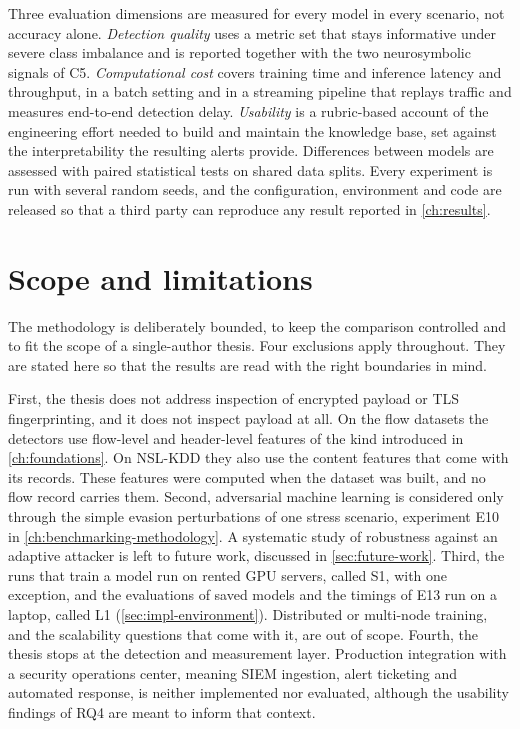 Three evaluation dimensions are measured for every model in every scenario,
not accuracy alone. \emph{Detection quality} uses a metric set that stays
informative under severe class imbalance and is reported together with the
two neurosymbolic signals of C5. \emph{Computational cost} covers training
time and inference latency and throughput, in a batch setting and in a
streaming pipeline that replays traffic and measures end-to-end detection
delay. \emph{Usability} is a rubric-based account of the engineering effort
needed to build and maintain the knowledge base, set against the
interpretability the resulting alerts provide. Differences between models
are assessed with paired statistical tests on shared data splits. Every
experiment is run with several random seeds, and the configuration,
environment and code are released so that a third party can reproduce any
result reported in \cref{ch:results}.

\section{Scope and limitations}
\label{sec:scope-limitations}

The methodology is deliberately bounded, to keep the comparison controlled
and to fit the scope of a single-author thesis. Four exclusions apply
throughout. They are stated here so that the results are read with the right
boundaries in mind.

First, the thesis does not address inspection of encrypted payload or TLS
fingerprinting, and it does not inspect payload at all. On the flow datasets
the detectors use flow-level and header-level features of the kind
introduced in \cref{ch:foundations}. On NSL-KDD they also use the content
features that come with its records. These features were computed when the
dataset was built, and no flow record carries them. Second, adversarial
machine learning is considered only through the simple evasion perturbations
of one stress scenario, experiment E10 in \cref{ch:benchmarking-methodology}. A
systematic study of robustness against an adaptive attacker is left to
future work, discussed in \cref{sec:future-work}. Third, the runs that train a
model run on rented GPU servers, called S1, with one exception, and the evaluations of saved models and
the timings of E13 run on a laptop, called L1 (\cref{sec:impl-environment}). Distributed or
multi-node training, and the scalability questions that come with it, are out of
scope.
Fourth, the thesis stops at the detection and measurement layer. Production
integration with a security operations center, meaning SIEM ingestion, alert
ticketing and automated response, is neither implemented nor evaluated,
although the usability findings of RQ4 are meant to inform that context.

